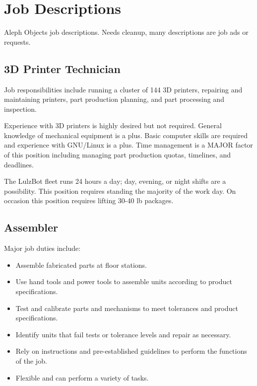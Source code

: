 %
%
%
%
%

\section{Job Descriptions}
Aleph Objects job descriptions. Needs cleanup, many descriptions are job ads or requests.

\subsection{3D Printer Technician}
Job responsibilities include running a cluster of 144 3D printers, repairing and maintaining printers, part production planning, and part processing and inspection.

Experience with 3D printers is highly desired but not required. General knowledge of mechanical equipment is a plus. Basic computer skills are required and experience with GNU/Linux is a plus. Time management is a MAJOR factor of this position including managing part production quotas, timelines, and deadlines.

The LulzBot fleet runs 24 hours a day; day, evening, or night shifts are a possibility. This position requires standing the majority of the work day. On occasion this position requires lifting 30-40 lb packages.

\subsection{Assembler}
Major job duties include:

\begin{itemize}
 \item Assemble fabricated parts at floor stations.
 \item Use hand tools and power tools to assemble units according to product specifications.
 \item Test and calibrate parts and mechanisms to meet tolerances and product specifications.
 \item Identify units that fail tests or tolerance levels and repair as necessary.
 \item Rely on instructions and pre-established guidelines to perform the functions of the job.
 \item Flexible and can perform a variety of tasks.
\end{itemize}


